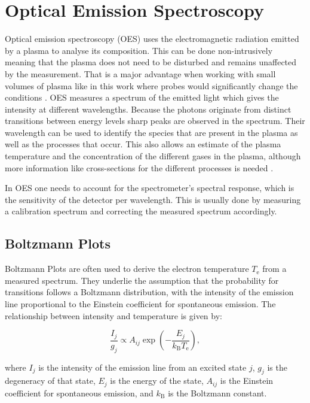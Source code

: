 \section{Optical Emission Spectroscopy}
Optical emission spectroscopy (OES) uses the electromagnetic radiation emitted by a plasma to analyse its composition. This can be done non-intrusively meaning that the plasma does not need to be disturbed and remains unaffected by the measurement. That is a major advantage when working with small volumes of plasma like in this work where probes would significantly change the conditions \cite{plasma2}. OES measures a spectrum of the emitted light which gives the intensity at different wavelengths. Because the photons originate from distinct transitions between energy levels sharp peaks are observed in the spectrum. Their wavelength can be used to identify the species that are present in the plasma as well as the processes that occur. This also allows an estimate of the plasma temperature and the concentration of the different gases in the plasma, although more information like cross-sections for the different processes is needed \cite{plasma2}. 

In OES one needs to account for the spectrometer's spectral response, which is the sensitivity of the detector per wavelength. This is usually done by measuring a calibration spectrum and correcting the measured spectrum accordingly.

\subsection{Boltzmann Plots}
\label{sec:boltzmann}
Boltzmann Plots are often used to derive the electron temperature $ T_\text{e} $ from a measured spectrum. They underlie the assumption that the probability for transitions follows a Boltzmann distribution, with the intensity of the emission line proportional to the Einstein coefficient for spontaneous emission. The relationship between intensity and temperature is given by:

\begin{equation}
    \frac{I_j}{g_j} \propto A_{ij} \exp\left( - \frac{E_j}{k_\text{B} T_\text{e}} \right),
\end{equation}

where $ I_j $ is the intensity of the emission line from an excited state $ j $, $ g_j $ is the degeneracy of that state, $ E_j $ is the energy of the state, $ A_{ij} $ is the Einstein coefficient for spontaneous emission, and $ k_\text{B} $ is the Boltzmann constant. 

